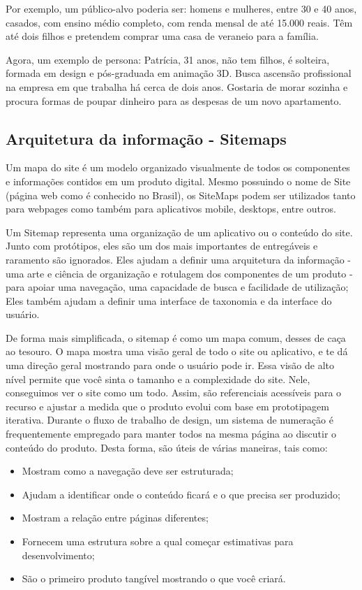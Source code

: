 Por exemplo, um público-alvo poderia ser: homens e mulheres, entre 30 e 40 anos, casados, com ensino médio completo, com renda mensal de até 15.000 reais. Têm até dois filhos e pretendem comprar uma casa de veraneio para a família.

Agora, um exemplo de persona: Patrícia, 31 anos, não tem filhos, é solteira, formada em design e pós-graduada em animação 3D. Busca ascensão profissional na empresa em que trabalha há cerca de dois anos. Gostaria de morar sozinha e procura formas de poupar dinheiro para as despesas de um novo apartamento.

\subsection{Arquitetura da informação - Sitemaps}

Um mapa do site é um modelo organizado visualmente de todos os componentes e informações contidos em um produto digital. Mesmo possuindo o nome de Site (página web como é conhecido no Brasil), os SiteMaps podem ser utilizados tanto para webpages como também para aplicativos mobile, desktops, entre outros. 

Um Sitemap representa uma organização de um aplicativo ou o conteúdo do site. Junto com protótipos, eles são um dos mais importantes de entregáveis e raramento são ignorados. Eles ajudam a definir uma arquitetura da informação - uma arte e ciência de organização e rotulagem dos componentes de um produto - para apoiar uma navegação, uma capacidade de busca e facilidade de utilização; Eles também ajudam a definir uma interface de taxonomia e da interface do usuário.

De forma mais simplificada, o sitemap é como um mapa comum, desses de caça ao tesouro. O mapa mostra uma visão geral de todo o site ou aplicativo, e te dá uma direção geral mostrando para onde o usuário pode ir. Essa visão de alto nível permite que você sinta o tamanho e a complexidade do site. Nele, conseguimos ver o site como um todo. Assim, são referenciais acessíveis para o recurso e ajustar a medida que o produto evolui com base em prototipagem iterativa. Durante o fluxo de trabalho de design, um sistema de numeração é frequentemente empregado para manter todos na mesma página ao discutir o conteúdo do produto. Desta forma, são úteis de várias maneiras, tais como:

\begin{itemize}
	\item Mostram como a navegação deve ser estruturada;
	\item Ajudam a identificar onde o conteúdo ficará e o que precisa ser produzido;
	\item Mostram a relação entre páginas diferentes;
	\item Fornecem uma estrutura sobre a qual começar estimativas para desenvolvimento;
	\item São o primeiro produto tangível mostrando o que você criará.
\end{itemize}

